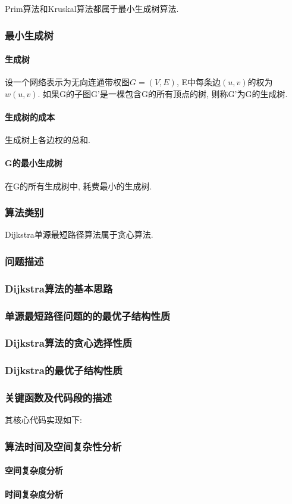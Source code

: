 Prim算法和Kruskal算法都属于最小生成树算法.
\subsubsection{最小生成树}
\paragraph*{生成树} 设一个网络表示为无向连通带权图$G=(V, E)$, E中每条边$(u,
	v)$的权为$w(u, v)$. 如果G的子图G'是一棵包含G的所有顶点的树,
则称G'为G的生成树.\par

\paragraph*{生成树的成本} 生成树上各边权的总和.\par

\paragraph*{G的最小生成树} 在G的所有生成树中, 耗费最小的生成树.

\subsubsection{算法类别}
Dijkstra单源最短路径算法属于贪心算法.

\subsubsection{问题描述}

\subsubsection{Dijkstra算法的基本思路}

\subsubsection{单源最短路径问题的的最优子结构性质}

\subsubsection{Dijkstra算法的贪心选择性质}

\subsubsection{Dijkstra的最优子结构性质}

\subsubsection{关键函数及代码段的描述}

其核心代码实现如下:


\subsubsection{算法时间及空间复杂性分析}
\paragraph{空间复杂度分析}

\paragraph{时间复杂度分析}
